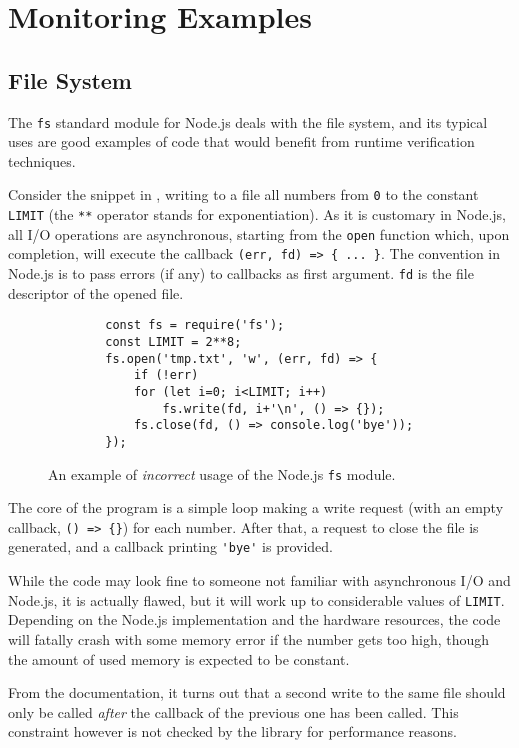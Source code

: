 \section{Monitoring Examples}
\label{sec:examples}
\subsection{File System}
The \lstinline{fs} standard module for Node.js deals with the file system, and its typical uses are good examples of code that would benefit from runtime verification techniques.

Consider the snippet in , writing to a file all numbers from \lstinline{0} to the constant \lstinline{LIMIT} (the \lstinline{**} operator stands for exponentiation).
As it is customary in Node.js, all I/O operations are asynchronous, starting from the \lstinline{open} function which, upon completion, will execute the callback \lstinline!(err, fd) => { ... }!.
The convention in Node.js is to pass errors (if any) to callbacks as first argument.
\lstinline{fd} is the file descriptor of the opened file.

\begin{figure}[h]
	\begin{lstlisting}
		const fs = require('fs');
		const LIMIT = 2**8;
		fs.open('tmp.txt', 'w', (err, fd) => {
			if (!err)
			for (let i=0; i<LIMIT; i++)
				fs.write(fd, i+'\n', () => {});
			fs.close(fd, () => console.log('bye'));
		});
	\end{lstlisting}
	\caption{An example of \emph{incorrect} usage of the Node.js \lstinline{fs} module.}
	\label{lst:fs}
\end{figure}

The core of the program is a simple loop making a write request (with an empty callback, \lstinline!() => {}!) for each number.
After that, a request to close the file is generated, and a callback printing \lstinline{'bye'} is provided.

While the code may look fine to someone not familiar with asynchronous I/O and Node.js, it is actually flawed, but it will work up to considerable values of \lstinline{LIMIT}.
Depending on the Node.js implementation and the hardware resources, the code will fatally crash with some memory error if the number gets too high, though the amount of used memory is expected to be constant.

From the documentation, it turns out that a second write to the same file should only be called \emph{after} the callback of the previous one has been called.
This constraint however is not checked by the library for performance reasons.

